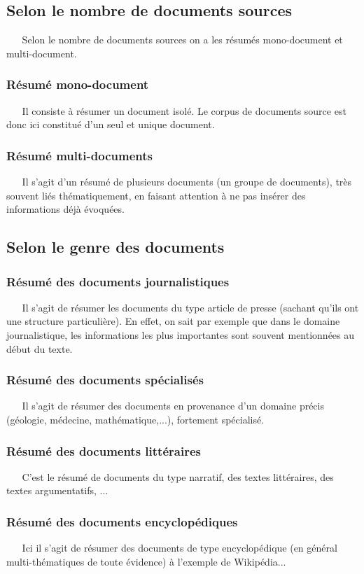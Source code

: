 \subsection{Selon le nombre de documents sources}
$ _{} $ $ _{} $ $ _{} $ $ _{} $ $ _{} $Selon le nombre de documents sources on a les résumés mono-document et multi-document.
\subsubsection{Résumé mono-document}
$ _{} $ $ _{} $ $ _{} $ $ _{} $ $ _{} $Il consiste à résumer un document isolé. Le corpus de documents source est donc ici constitué d'un seul et unique document. 
\subsubsection{Résumé multi-documents}
$ _{} $ $ _{} $ $ _{} $ $ _{} $ $ _{} $Il s'agit d'un résumé de plusieurs documents (un groupe de documents), très souvent liés thé\-ma\-ti\-que\-ment, en faisant attention à ne pas insérer des informations déjà évoquées.
\subsection{Selon le genre des documents}
\subsubsection{Résumé des documents journalistiques}
$ _{} $ $ _{} $ $ _{} $ $ _{} $ $ _{} $Il s'agit de résumer les documents du type article de presse (sachant qu'ils ont une structure particulière). En effet, on sait par exemple que dans le domaine journalistique, les informations les plus importantes sont souvent mentionnées au début du texte.\cite{MaaliMnasri}
\subsubsection{Résumé des documents spécialisés}
$ _{} $ $ _{} $ $ _{} $ $ _{} $ $ _{} $Il s'agit de résumer des documents en provenance d'un domaine précis (géologie, médecine, mathématique,...), fortement spécialisé.
\subsubsection{Résumé des documents littéraires}
$ _{} $ $ _{} $ $ _{} $ $ _{} $ $ _{} $C'est le résumé de documents du type narratif, des textes littéraires, des textes ar\-gu\-men\-ta\-tifs, ...
\subsubsection{Résumé des documents encyclopédiques}
$ _{} $ $ _{} $ $ _{} $ $ _{} $ $ _{} $Ici il s'agit de résumer des documents de type encyclopédique (en général multi-thématiques de toute évidence) à l'exemple de Wikipédia...
